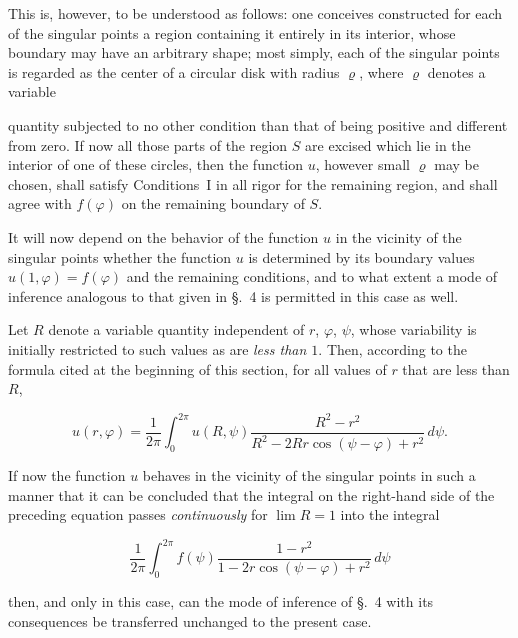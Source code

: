 \documentclass{article}
\begin{document}
This is, however, to be understood as follows: one conceives constructed for each of the singular points a region containing it entirely in its interior, whose boundary may have an arbitrary shape; most simply, each of the singular points is regarded as the center of a circular disk with radius $\varrho$, where $\varrho$ denotes a variable




quantity subjected to no other condition than that of being positive and different from zero. If now all those parts of the region $S$ are excised which lie in the interior of one of these circles, then the function $u$, however small $\varrho$ may be chosen, shall satisfy Conditions~I in all rigor for the remaining region, and shall agree with $f(\varphi)$ on the remaining boundary of $S$.



It will now depend on the behavior of the function $u$ in the vicinity of the singular points whether the function $u$ is determined by its boundary values $u(1, \varphi) = f(\varphi)$ and the remaining conditions, and to what extent a mode of inference analogous to that given in §.~4 is permitted in this case as well.



Let $R$ denote a variable quantity independent of $r$, $\varphi$, $\psi$, whose variability is initially restricted to such values as are \emph{less than $1$}. Then, according to the formula cited at the beginning of this section, for all values of $r$ that are less than $R$,

\[

u(r, \varphi) = \frac{1}{2\pi} \int_0^{2\pi} u(R, \psi) \frac{R^2 - r^2}{R^2 - 2Rr \cos(\psi - \varphi) + r^2}\,d\psi.

\]



If now the function $u$ behaves in the vicinity of the singular points in such a manner that it can be concluded that the integral on the right-hand side of the preceding equation passes \emph{continuously} for $\lim R = 1$ into the integral

\[

\frac{1}{2\pi} \int_0^{2\pi} f(\psi) \frac{1 - r^2}{1 - 2r \cos(\psi - \varphi) + r^2}\,d\psi

\]

then, and only in this case, can the mode of inference of §.~4 with its consequences be transferred unchanged to the present case.
\end{document}
